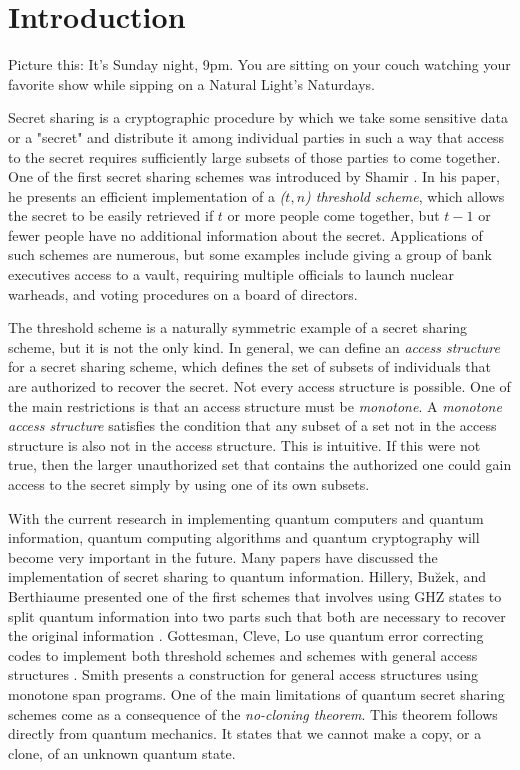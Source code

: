 \chapter{Introduction}

Picture this: It's Sunday night, 9pm. You are sitting on your couch watching your favorite show while sipping on a Natural Light's Naturdays.

Secret sharing is a cryptographic procedure by which we take some sensitive data or a "secret" and distribute it among individual parties in such a way that access to the secret requires sufficiently large subsets of those parties to come together. One of the first secret sharing schemes was introduced by Shamir \cite{shamir}. In his paper, he presents an efficient implementation of a \textit{($t,n$) threshold scheme}, which allows the secret to be easily retrieved if $t$ or more people come together, but $t-1$ or fewer people have no additional information about the secret. Applications of such schemes are numerous, but some examples include giving a group of bank executives  access to a vault, requiring multiple officials to launch nuclear warheads, and voting procedures on a board of directors.

The threshold scheme is a naturally symmetric example of a secret sharing scheme, but it is not the only kind. In general, we can define an \textit{access structure} for a secret sharing scheme, which defines the set of subsets of individuals that are authorized to recover the secret. Not every access structure is possible. One of the main restrictions is that an access structure must be \textit{monotone}. A \textit{monotone access structure} satisfies the condition that any subset of a set not in the access structure is also not in the access structure. This is intuitive. If this were not true, then the larger unauthorized set that contains the authorized one could gain access to the secret simply by using one of its own subsets. 

With the current research in implementing quantum computers and quantum information, quantum computing algorithms and quantum cryptography will become very important in the future. Many papers have discussed the implementation of secret sharing to quantum information. Hillery, Bu\u{z}ek, and Berthiaume presented one of the first schemes that involves using GHZ states to split quantum information into two parts such that both are necessary to recover the original information \cite{Hillery_1999}. Gottesman, Cleve, Lo use quantum error correcting codes to implement both threshold schemes and schemes with general access structures \cite{Cleve_1999}. Smith presents a construction for general access structures using monotone span programs. One of the main limitations of quantum secret sharing schemes come as a consequence of the \textit{no-cloning theorem}. This theorem follows directly from quantum mechanics. It states that we cannot make a copy, or a clone, of an unknown quantum state. 

